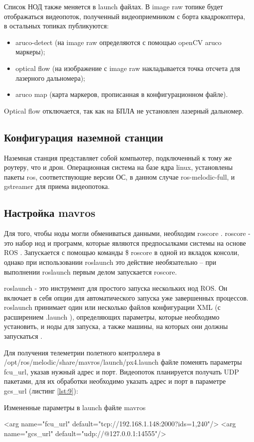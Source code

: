 Список НОД также меняется в launch файлах. В image raw топике будет отображаться видеопоток, полученный видеоприемником с борта квадрокоптера, в остальных топиках публикуются:
\begin{itemize}
	\item aruco-detect (на image raw определяются с помощью openCV aruco маркеры);
	\item optical flow (на изображение с image raw накладывается точка отсчета для лазерного дальномера);
	\item aruco map (карта маркеров, прописанная в конфигурационном файле).
\end{itemize}

Optical flow отключается, так как на БПЛА не установлен лазерный дальномер.
\subsection{Конфигурация наземной станции}
Наземная станция представляет собой компьютер, подключенный к тому же роутеру, что и дрон. Операционная система на базе ядра linux, установлены пакеты ros, соответствующие версии ОС, в данном случае ros-melodic-full, и gstreamer для приема видеопотока.

\subsection{Настройка mavros}
Для того, чтобы ноды могли обмениваться данными, необходим roscore \cite{pkg}. roscore - это набор нод и программ, которые являются предпосылками системы на основе ROS \cite{ros}. Запускается с помощью команды \$ roscore в одной из вкладок консоли, однако при использовании roslaunch это действие необязательно -- при выполнении roslaunch первым делом запускается roscore.

roslaunch - это инструмент для простого запуска нескольких нод ROS. Он включает в себя опции для автоматического запуска уже завершенных процессов. roslaunch принимает один или несколько файлов конфигурации XML (с расширением .launch ), определяющих параметры, которые необходимо установить, и ноды для запуска, а также машины, на которых они должны запускаться \cite{ros}.

Для получения телеметрии полетного контроллера в /opt/ros/melodic/sha\-re/mavros/launch/px4.launch файле поменять параметры fcu\_url, указав нужный адрес и порт. Видеопоток планируется получать UDP пакетами, для их обработки необходимо указать адрес и порт в параметре gcs\_url (листинг \ref{lst:9}):
\begin{Program}[H]
	\caption{Измененные параметры в launch файле mavros} \label{lst:9}
	\begin{MyCode}
	<arg name="fcu_url" default="tcp://192.168.1.148:2000?ids=1,240"/>   
	<arg name="gcs_url" default="udp://@127.0.0.1:14555"/>
	\end{MyCode}
\end{Program}

